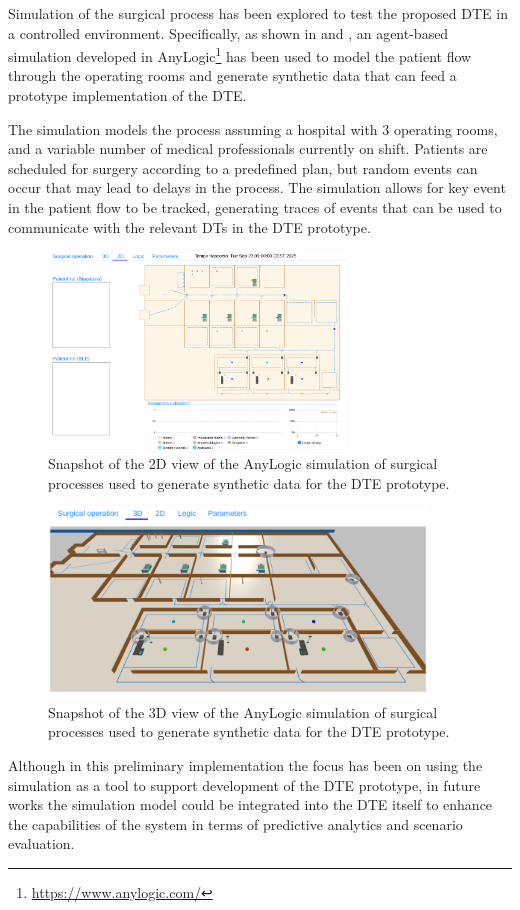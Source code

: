 Simulation of the surgical process has been explored to test the proposed \ac{DTE} in a controlled environment.
%
Specifically, as shown in  and , an agent-based simulation developed in AnyLogic\footnote{\url{https://www.anylogic.com/}} has been used to model the patient flow through the operating rooms and generate synthetic data that can feed a prototype implementation of the \ac{DTE}.

The simulation models the process assuming a hospital with 3 operating rooms, and a variable number of medical professionals currently on shift. 
%
Patients are scheduled for surgery according to a predefined plan, but random events can occur that may lead to delays in the process.
%
The simulation allows for key event in the patient flow to be tracked, generating traces of events that can be used to communicate with the relevant \acp{DT} in the \ac{DTE} prototype.


\begin{figure}[ht]
    \centering
    \includegraphics[width=0.7\textwidth]{figures/orm/anylogic.png}
    \caption{Snapshot of the 2D view of the AnyLogic simulation of surgical processes used to generate synthetic data for the DTE prototype.}
    \label{fig:orm:anylogic}
\end{figure}

\begin{figure}[ht]
    \centering
    \includegraphics[width=0.9\textwidth]{figures/orm/anylogic2.png}
    \caption{Snapshot of the 3D view of the AnyLogic simulation of surgical processes used to generate synthetic data for the DTE prototype.}
    \label{fig:orm:anylogic2}
\end{figure}

Although in this preliminary implementation the focus has been on using the simulation as a tool to support development of the \ac{DTE} prototype, in future works the simulation model could be integrated into the \ac{DTE} itself to enhance the capabilities of the system in terms of predictive analytics and scenario evaluation.

